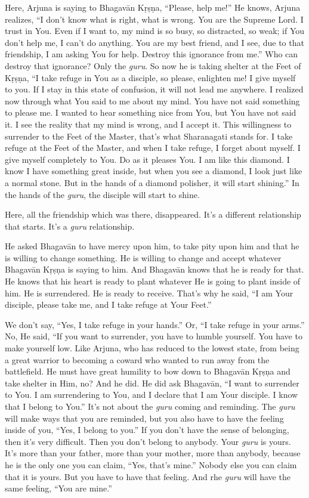 Here, Arjuna is saying to Bhagavān Kṛṣṇa, “Please, help me!” He knows, Arjuna realizes, “I don’t know what is right, what is wrong. You are the Supreme Lord. I trust in You. Even if I want to, my mind is so busy, so distracted, so weak; if You don’t help me, I can’t do anything. You are my best friend, and I see, due to that friendship, I am asking You for help. Destroy this ignorance from me.” Who can destroy that ignorance? Only the \textit{guru}. So now he is taking shelter at the Feet of Kṛṣṇa, “I take refuge in You as a disciple, so please, enlighten me! I give myself to you. If I stay in this state of confusion, it will not lead me anywhere. I realized now through what You said to me about my mind. You have not said something to please me. I wanted to hear something nice from You, but You have not said it. I see the reality that my mind is wrong, and I accept it. This willingness to surrender to the Feet of the Master, that’s what Sharanagati stands for. I take refuge at the Feet of the Master, and when I take refuge, I forget about myself. I give myself completely to You. Do as it pleases You. I am like this diamond. I know I have something great inside, but when you see a diamond, I look just like a normal stone. But in the hands of a diamond polisher, it will start shining.” In the hands of the \textit{guru}, the disciple will start to shine.

Here, all the friendship which was there, disappeared. It’s a different relationship that starts. It’s a \textit{guru} relationship.

He asked Bhagavān to have mercy upon him, to take pity upon him and that he is willing to change something. He is willing to change and accept whatever Bhagavān Kṛṣṇa is saying to him. And Bhagavān knows that he is ready for that. He knows that his heart is ready to plant whatever He is going to plant inside of him. He is surrendered. He is ready to receive. That’s why he said, “I am Your disciple, please take me, and I take refuge at Your Feet.”

We don’t say, “Yes, I take refuge in your hands.” Or, “I take refuge in your arms.” No, He said, “If you want to surrender, you have to humble yourself. You have to make yourself low. Like Arjuna, who has reduced to the lowest state, from being a great warrior to becoming a coward who wanted to run away from the battlefield. He must have great humility to bow down to Bhagavān Kṛṣṇa and take shelter in Him, no? And he did. He did ask Bhagavān, “I want to surrender to You. I am surrendering to You, and I declare that I am Your disciple. I know that I belong to You.” It’s not about the \textit{guru} coming and reminding. The \textit{guru} will make ways that you are reminded, but you also have to have the feeling inside of you, “Yes, I belong to you.” If you don’t have the sense of belonging, then it’s very difficult. Then you don’t belong to anybody. Your \textit{guru} is yours. It’s more than your father, more than your mother, more than anybody, because he is the only one you can claim, “Yes, that’s mine.” Nobody else you can claim that it is yours. But you have to have that feeling. And rhe \textit{guru} will have the same feeling, “You are mine.”


